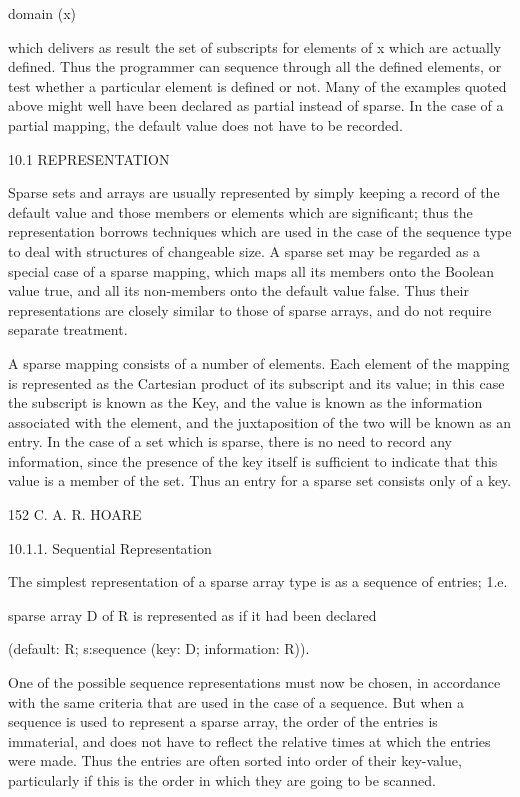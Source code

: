 {{		domain (x)
		
		which delivers as result the set of subscripts for elements of x which are actually defined. Thus the programmer can sequence through all the defined elements, or test whether a particular element is defined or not. Many of the examples quoted above might well have been declared as partial instead of sparse. In the case of a partial mapping, the default value does not have to be recorded.
		
		10.1 REPRESENTATION
		
		Sparse sets and arrays are usually represented by simply keeping a record of the default value and those members or elements which are significant; thus the representation borrows techniques which are used in the case of the sequence type to deal with structures of changeable size. A sparse set may be regarded as a special case of a sparse mapping, which maps all its members onto the Boolean value true, and all its non-members onto the default value false. Thus their representations are closely similar to those of sparse arrays, and do not require separate treatment.
		
		A sparse mapping consists of a number of elements. Each element of the mapping is represented as the Cartesian product of its subscript and its value; in this case the subscript is known as the Key, and the value is known as the information associated with the element, and the juxtaposition of the two will be known as an entry. In the case of a set which is sparse, there is no need to record any information, since the presence of the key itself is sufficient to indicate that this value is a member of the set. Thus an entry for a sparse set consists only of a key.
		
		152 C. A. R. HOARE
		
		10.1.1. Sequential Representation
		
		The simplest representation of a sparse array type is as a sequence of entries; 1.e.
		
		sparse array D of R is represented as if it had been declared
		
		(default: R; s:sequence (key: D; information: R)).
		
		One of the possible sequence representations must now be chosen, in accordance with the same criteria that are used in the case of a sequence. But when a sequence is used to represent a sparse array, the order of the entries is immaterial, and does not have to reflect the relative times at which the entries were made. Thus the entries are often sorted into order of their key-value, particularly if this is the order in which they are going to be scanned.
		
}}
